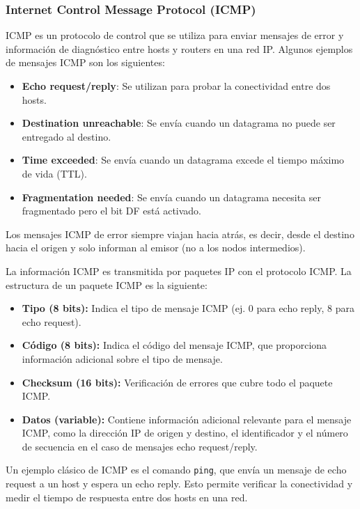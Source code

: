 \subsubsection{Internet Control Message Protocol (ICMP)}

ICMP es un protocolo de control que se utiliza para enviar mensajes de error y información de diagnóstico entre hosts y routers en una red IP. Algunos ejemplos de mensajes ICMP son los siguientes:
\begin{itemize}
  \item \textbf{Echo request/reply}: Se utilizan para probar la conectividad entre dos hosts.
  \item \textbf{Destination unreachable}: Se envía cuando un datagrama no puede ser entregado al destino.
  \item \textbf{Time exceeded}: Se envía cuando un datagrama excede el tiempo máximo de vida (TTL).
  \item \textbf{Fragmentation needed}: Se envía cuando un datagrama necesita ser fragmentado pero el bit DF está activado.
\end{itemize}

Los mensajes ICMP de error siempre viajan hacia atrás, es decir, desde el destino hacia el origen y solo informan al emisor (no a los nodos intermedios).

La información ICMP es transmitida por paquetes IP con el protocolo ICMP. La estructura de un paquete ICMP es la siguiente:
\begin{itemize}
  \item \textbf{Tipo (8 bits):} Indica el tipo de mensaje ICMP (ej. 0 para echo reply, 8 para echo request).
  \item \textbf{Código (8 bits):} Indica el código del mensaje ICMP, que proporciona información adicional sobre el tipo de mensaje.
  \item \textbf{Checksum (16 bits):} Verificación de errores que cubre todo el paquete ICMP.
  \item \textbf{Datos (variable):} Contiene información adicional relevante para el mensaje ICMP, como la dirección IP de origen y destino, el identificador y el número de secuencia en el caso de mensajes echo request/reply.
\end{itemize}

Un ejemplo clásico de ICMP es el comando \texttt{ping}, que envía un mensaje de echo request a un host y espera un echo reply. Esto permite verificar la conectividad y medir el tiempo de respuesta entre dos hosts en una red.

